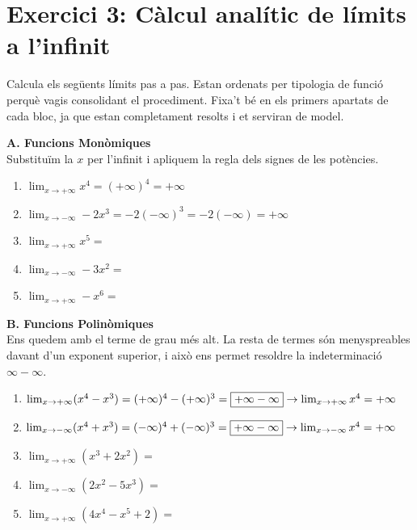 \documentclass[12pt,a4paper]{article}
\begin{document}
\newpage
\section*{Exercici 3: Càlcul analític de límits a l'infinit}

Calcula els següents límits pas a pas. Estan ordenats per tipologia de funció perquè vagis consolidant el procediment. Fixa't bé en els primers apartats de cada bloc, ja que estan completament resolts i et serviran de model.

\vspace{0.5cm}

\textbf{A. Funcions Monòmiques} \\
Substituïm la $x$ per l'infinit i apliquem la regla dels signes de les potències.

\vspace{-0.2cm}
\begin{enumerate}[label=\textbf{\arabic*.}, itemsep=0.8cm]
    \item $\lim_{x \to +\infty} x^4 = (+\infty)^4 = \mathbf{+\infty}$
    \item $\lim_{x \to -\infty} -2x^3 = -2(-\infty)^3 = -2(-\infty) = \mathbf{+\infty}$
    \item $\lim_{x \to +\infty} x^5 =$
    \item $\lim_{x \to -\infty} -3x^2 =$
    \item $\lim_{x \to +\infty} -x^6 =$
\end{enumerate}

\vspace{0.5cm}

\textbf{B. Funcions Polinòmiques} \\
Ens quedem amb el terme de grau més alt. La resta de termes són menyspreables davant d'un exponent superior, i això ens permet resoldre la indeterminació $\infty - \infty$.

\vspace{-0.2cm}
\begin{enumerate}[label=\textbf{\arabic*.}, resume, itemsep=0.8cm]
    \item $\lim_{x \to +\infty} (x^4 - x^3) = (+\infty)^4 - (+\infty)^3 = \fbox{$+\infty - \infty$} \rightarrow \lim_{x\to +\infty} x^4 = \mathbf{+\infty}$
    \item $\lim_{x \to -\infty} (x^4 + x^3) = (-\infty)^4 + (-\infty)^3 = \fbox{$+\infty - \infty$} \rightarrow \lim_{x\to -\infty} x^4 = \mathbf{+\infty}$
    \item $\lim_{x \to +\infty} (x^3 + 2x^2) =$
    \item $\lim_{x \to -\infty} (2x^2 - 5x^3) =$
    \item $\lim_{x \to +\infty} (4x^4 - x^5 + 2) =$
\end{enumerate}
\newpage
\vspace{0.5cm}
\end{document}
